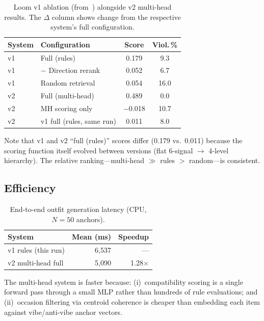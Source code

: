 \documentclass[10pt,twocolumn]{article}
\begin{document}
\begin{table}[t]
\centering
\small
\caption{Loom v1 ablation (from~\citet{berlia2026loom}) alongside v2
multi-head results.  The $\Delta$ column shows change from the
respective system's full configuration.}
\label{tab:v1_comparison}
\begin{tabular}{@{}llcc@{}}
\toprule
System & Configuration & Score & Viol.\,\% \\
\midrule
v1 & Full (rules)           & 0.179 & 9.3 \\
v1 & $-$ Direction rerank   & 0.052 & 6.7 \\
v1 & Random retrieval       & 0.054 & 16.0 \\
\midrule
v2 & Full (multi-head)      & 0.489 & 0.0 \\
v2 & MH scoring only        & $-$0.018 & 10.7 \\
v2 & v1 full (rules, same run) & 0.011 & 8.0 \\
\bottomrule
\end{tabular}
\end{table}

Note that v1 and v2 ``full (rules)'' scores differ (0.179 vs.\ 0.011)
because the scoring function itself evolved between versions (flat
6-signal $\to$ 4-level hierarchy).  The relative ranking---multi-head
$\gg$ rules $>$ random---is consistent.

\subsection{Efficiency}

\begin{table}[t]
\centering
\small
\caption{End-to-end outfit generation latency (CPU, $N{=}50$ anchors).}
\label{tab:latency_v2}
\begin{tabular}{@{}lrr@{}}
\toprule
System & Mean (ms) & Speedup \\
\midrule
v1 rules (this run)    & 6,537 & --- \\
v2 multi-head full     & 5,090 & 1.28$\times$ \\
\bottomrule
\end{tabular}
\end{table}

The multi-head system is faster because:
(i)~compatibility scoring is a single forward pass through a small MLP
rather than hundreds of rule evaluations; and
(ii)~occasion filtering via centroid coherence is cheaper than embedding
each item against vibe/anti-vibe anchor vectors.
\end{document}
